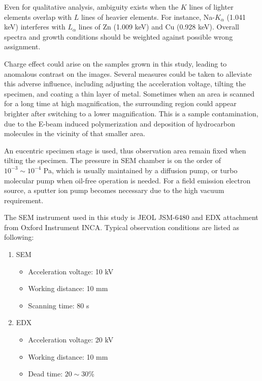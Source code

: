 Even for qualitative analysis, ambiguity exists when the $K$ lines of lighter elements overlap with $L$ lines of heavier elements. For instance, Na-$K_\alpha$ (1.041 keV) interferes with $L_\alpha$ lines of Zn (1.009 keV) and Cu (0.928 keV). Overall spectra and growth conditions should be weighted against possible wrong assignment. 

Charge effect could arise on the samples grown in this study, leading to anomalous contrast on the images. Several measures could be taken to alleviate this adverse influence, including adjusting the acceleration voltage, tilting the specimen, and coating a thin layer of metal. Sometimes when an area is scanned for a long time at high magnification, the surrounding region could appear brighter after switching to a lower magnification. This is a sample contamination, due to the E-beam induced polymerization and deposition of hydrocarbon molecules in the vicinity of that smaller area. 


\iffalse
An eucentric specimen stage is used, thus observation area remain fixed when tilting the specimen. The pressure in SEM chamber is on the order of $10^{-3} \sim 10^{-4}$ Pa, which is usually maintained by a diffusion pump, or turbo molecular pump when oil-free operation is needed. For a field emission electron source, a sputter ion pump becomes necessary due to the high vacuum requirement. 

The SEM instrument used in this study is JEOL JSM-6480 and EDX attachment from Oxford Instrument INCA. Typical observation conditions are listed as following:

\begin{enumerate}
\item SEM
\begin{itemize}

\item Acceleration voltage: 10 kV
\item Working distance: 10 mm
\item Scanning time: 80 s
\end{itemize}
\item EDX
\begin{itemize}

\item Acceleration voltage: 20 kV
\item Working distance: 10 mm
\item Dead time: $20\sim30$\%
\end{itemize}
\end{enumerate}



